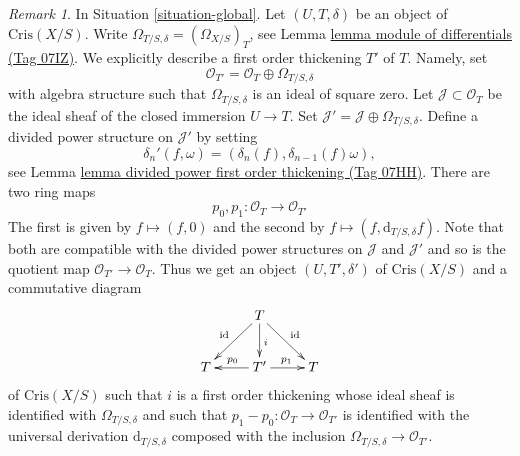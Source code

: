 \documentclass{amsart}
\theoremstyle{plain}
\theoremstyle{definition}
\theoremstyle{remark}
\newtheorem{remark}[subsection]{Remark}
\numberwithin{equation}{subsection}
\begin{document}
\begin{remark}
\label{remark-first-order-thickening}
In Situation \ref{situation-global}.
Let $(U, T, \delta)$ be an object of $\text{Cris}(X/S)$.
Write $\Omega_{T/S, \delta} = (\Omega_{X/S})_T$, see
Lemma \href{https://stacks.math.columbia.edu/tag/07IZ}{lemma module of differentials (Tag 07IZ)}.
We explicitly describe a first order thickening $T'$ of
$T$. Namely, set
$$
\mathcal{O}_{T'} = \mathcal{O}_T \oplus \Omega_{T/S, \delta}
$$
with algebra structure such that $\Omega_{T/S, \delta}$ is an
ideal of square zero. Let $\mathcal{J} \subset \mathcal{O}_T$
be the ideal sheaf of the closed immersion $U \to T$. Set
$\mathcal{J}' = \mathcal{J} \oplus \Omega_{T/S, \delta}$.
Define a divided power structure on $\mathcal{J}'$ by setting
$$
\delta_n'(f, \omega) = (\delta_n(f), \delta_{n - 1}(f)\omega),
$$
see Lemma \href{https://stacks.math.columbia.edu/tag/07HH}{lemma divided power first order thickening (Tag 07HH)}.
There are two ring maps
$$
p_0, p_1 : \mathcal{O}_T \to \mathcal{O}_{T'}
$$
The first is given by $f \mapsto (f, 0)$ and the second by
$f \mapsto (f, \text{d}_{T/S, \delta}f)$. Note that both are compatible
with the divided power structures on $\mathcal{J}$ and $\mathcal{J}'$
and so is the quotient map $\mathcal{O}_{T'} \to \mathcal{O}_T$.
Thus we get an object $(U, T', \delta')$ of $\text{Cris}(X/S)$
and a commutative diagram
$$
\xymatrix{
& T \ar[ld]_{\text{id}} \ar[d]^i \ar[rd]^{\text{id}} \\
T & T' \ar[l]_{p_0} \ar[r]^{p_1} & T
}
$$
of $\text{Cris}(X/S)$ such that $i$ is a first order thickening whose ideal
sheaf is identified with $\Omega_{T/S, \delta}$ and such that
$p_1 - p_0 : \mathcal{O}_T \to \mathcal{O}_{T'}$
is identified with the universal derivation $\text{d}_{T/S, \delta}$
composed with the inclusion $\Omega_{T/S, \delta} \to \mathcal{O}_{T'}$.
\end{remark}
\end{document}
